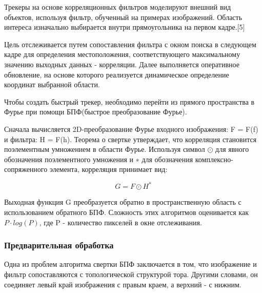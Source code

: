 \documentclass[a4paper,14pt]{extarticle}
\begin{document}
Трекеры на основе корреляционных фильтров моделируют внешний вид объектов, используя фильтр, обученный на примерах изображений. Область интереса изначально выбирается внутри прямоугольника на первом кадре.[5]

Цель отслеживается путем сопоставления фильтра с окном поиска в следующем кадре для определения местоположения, соответствующего максимальному значению выходных данных - корреляции. Далее выполняется оперативное обновление, на основе которого реализуется динамическое определение координат выбранной области.

Чтобы создать быстрый трекер, необходимо перейти из прямого пространства в Фурье при помощи БПФ(быстрое преобразование Фурье). 


Сначала вычисляется 2D-преобразование Фурье входного изображения: F = F(f) и фильтра: H = F(h). Теорема о свертке утверждает, что корреляция становится поэлементным умножением в области Фурье. Используя символ $\odot$  для явного обозначения поэлементного умножения и ∗ для обозначения комплексно-сопряженного элемента, корреляция принимает вид:

\begin{equation}
    G = F \odot H^*        
\end{equation}

Выходная функция G преобразуется обратно в пространственную область с использованием обратного БПФ. Сложность этих алгоритмов оценивается как $P \cdot log(P)$, где P - количество пикселей в окне отслеживания.


\subsubsection{Предварительная обработка}

Одна из проблем алгоритма свертки БПФ заключается в том, что изображение и фильтр сопоставляются с топологической структурой тора. Другими словами, он соединяет левый край изображения с правым краем, а верхний - с нижним.
\end{document}
